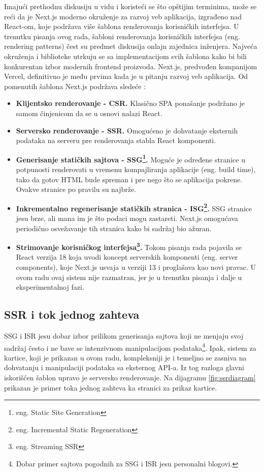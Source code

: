 \documentclass[12pt,oneside]{memoir}
\begin{document}
Imajući prethodnu diskusiju u vidu i koristeći se što opštijim terminima, može se reći da je Next.js moderno okruženje za razvoj veb aplikacija, izgrađeno nad React-om, koje podržava više šablona renderovanja korisničkih interfejsa. U trenutku pisanja ovog rada, šabloni renderovanja korisničkih interfejsa (eng. rendering patterns) čest su predmet diskusija onlajn zajednica inženjera. Najveća okruženja i biblioteke utrkuju se sa implementacijom svih šablona kako bi bili konkurentan izbor modernih frontend proizvoda. Next.js, predvođen kompanijom Vercel, definitivno je među prvima kada je u pitanju razvoj veb aplikacija. Od pomenutih šablona Next.js podržava sledeće \cite{nextjsdocs}:
\begin{itemize}
    \item \textbf{Klijentsko renderovanje - CSR.} Klasično SPA ponašanje podržano je samom činjenicom da se u osnovi nalazi React.
    \item \textbf{Serversko renderovanje - SSR.} Omogućeno je dohvatanje eksternih podataka na serveru pre renderovanja stabla React komponenti.
    \item \textbf{Generisanje statičkih sajtova - SSG\footnote{eng. Static Site Generation}.} Moguće je određene stranice u potpunosti renderovati u vremenu kompajliranja aplikacije (eng. build time), tako da gotov HTML bude spreman i pre nego što se aplikacija pokrene. Ovakve stranice po pravilu su najbrže.
    \item \textbf{Inkrementalno regenerisanje statičkih stranica - ISG\footnote{eng. Incremental Static Regeneration}.} SSG stranice jesu brze, ali mana im je što podaci mogu zastareti. Next.js omogućava periodično osvežavanje tih stranica kako bi sadržaj bio ažuran.
    \item \textbf{Strimovanje korisničkog interfejsa\footnote{eng. Streaming SSR}.} Tokom pisanja rada pojavila se React verzija 18 koja uvodi koncept serverskih komponenti (eng. server components), koje Next.js usvaja u verziji 13 i proglašava kao novi pravac. U ovom radu ovaj sistem nije razmatran, jer je u trenutku pisanja i dalje u eksperimentalnoj fazi.
\end{itemize}

\subsection{SSR i tok jednog zahteva}

SSG i ISR jesu dobar izbor prilikom generisanja sajtova koji ne menjaju svoj sadržaj često i ne bave se intenzivnom manipulacijom podataka\footnote{Dobar primer sajtova pogodnih za SSG i ISR jesu personalni blogovi.}. Ipak, sistem za kartice, koji je prikazan u ovom radu, kompleksniji je i temeljno se zasniva na dohvatanju i manipulaciji podataka sa eksternog API-a. Iz tog razloga glavni iskorišćen šablon upravo je serversko renderovanje. Na dijagramu \ref{fig:ssrdiagram} prikazan je primer toka jednog zahteva ka stranici za prikaz kartice.
\end{document}
